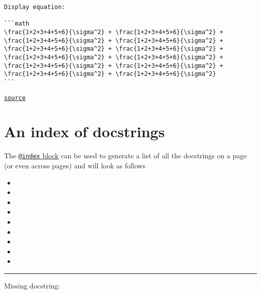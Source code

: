 \begin{adjustwidth}{2em}{0pt}
\begin{lstlisting}
Display equation:

```math
\frac{1+2+3+4+5+6}{\sigma^2} + \frac{1+2+3+4+5+6}{\sigma^2} + \frac{1+2+3+4+5+6}{\sigma^2} + \frac{1+2+3+4+5+6}{\sigma^2} + \frac{1+2+3+4+5+6}{\sigma^2} + \frac{1+2+3+4+5+6}{\sigma^2} + \frac{1+2+3+4+5+6}{\sigma^2} + \frac{1+2+3+4+5+6}{\sigma^2} + \frac{1+2+3+4+5+6}{\sigma^2} + \frac{1+2+3+4+5+6}{\sigma^2} + \frac{1+2+3+4+5+6}{\sigma^2} + \frac{1+2+3+4+5+6}{\sigma^2}
```
\end{lstlisting}



\href{https://example.org/Repository.jl/blob/test/examples/make.jl#L41-71}{\texttt{source}}


\end{adjustwidth}

\section{An index of docstrings}



\label{4901604269105032859}{}


The \href{@ref}{\texttt{@index} block} can be used to generate a list of all the docstrings on a page (or even across pages) and will look as follows


\begin{itemize}
\item {}
\item {}
\item {}
\item {}
\item {}
\item {}
\item {}
\item {}
\item {}
\end{itemize}


{\rule{\textwidth}{1pt}}


Missing docstring:



